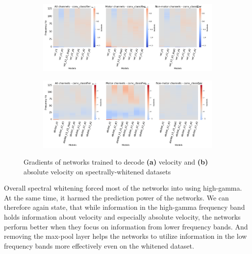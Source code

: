 \begin{figure}[!htbp]
\begin{subfigure}[a]{\textwidth}
   \includegraphics[width=1\linewidth]{img/ch4/vel-pw-last-layer-grads}
   \caption{}
   \label{fig:vel-pw-last-layer-grads}
\end{subfigure}

\begin{subfigure}[b]{\textwidth}
   \includegraphics[width=1\linewidth]{img/ch4/absVel-pw-last-layer-grads}
   \caption{}
   \label{fig:absVel-pw-last-layet-grads}
\end{subfigure}
\caption[Spectral whitening - gradients]{Gradients of networks trained to decode \textbf{(a)} velocity and \textbf{(b)} absolute velocity on spectrally-whitened datasets}
\label{fig:pw-last-layer-grads}
\end{figure}

Overall spectral whitening forced most of the networks into using high-gamma. 
At the same time, it harmed the prediction power of the networks.
We can therefore again state, that while information in the high-gamma frequency band holds information about velocity and especially absolute velocity, the networks perform better when they focus on information from lower frequency bands. 
And removing the max-pool layer helps the networks to utilize information in the low frequency bands more effectively even on the whitened dataset.


